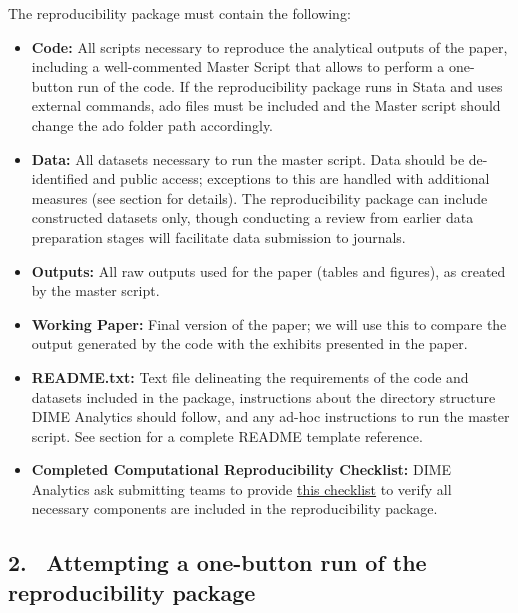 \begin{fullwidth}
	The reproducibility package must contain the following:

	\bigskip

	\begin{itemize}
		\setlength\itemsep{-0.1em}
		\item \textbf{Code:} All scripts necessary to reproduce the analytical outputs of the paper, including a well-commented Master Script that allows to perform a one-button run of the code. If the reproducibility package runs in Stata and uses external commands, ado files must be included and the Master script should change the ado folder path accordingly.
		\item \textbf{Data:} All datasets necessary to run the master script. Data should be de-identified and public access; exceptions to this are handled with additional measures (see section  for details). The reproducibility package can include constructed datasets only, though conducting a review from earlier data preparation stages will facilitate data submission to journals.
		\item \textbf{Outputs:} All raw outputs used for the paper (tables and figures), as created by the master script.
		\item \textbf{Working Paper:} Final version of the paper; we will use this to compare the output generated by the code with the exhibits presented in the paper.
		\item \textbf{README.txt:} Text file delineating the requirements of the code and datasets included in the package, instructions about the directory structure DIME Analytics should follow, and any ad-hoc instructions to run the master script. See section  for a complete README template reference.
		\item \textbf{Completed Computational Reproducibility Checklist:} DIME Analytics ask submitting teams to provide \href{https://raw.githubusercontent.com/worldbank/dime-standards/master/dime-research-standards/pillar-3-research-reproducibility/checklists/Reproducibility%20package%20submission%20checklist.pdf}{this checklist} to verify all necessary components are included in the reproducibility package.
	\end{itemize}

	\subsection{2. \, Attempting a one-button run of the reproducibility package}


\end{fullwidth}
